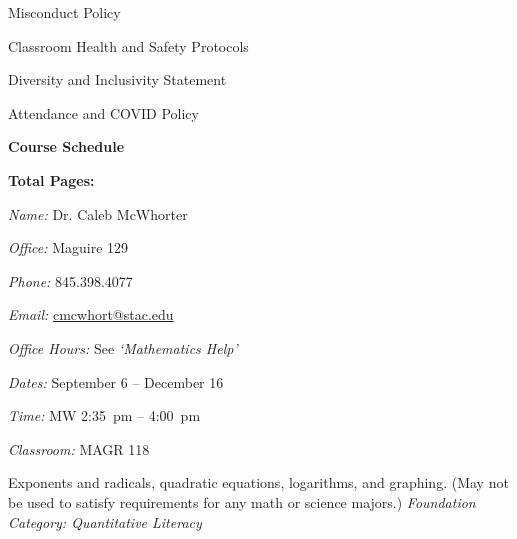 \documentclass[11pt,letterpaper]{article}
\makeatletter
\newcommand{\classdates}{September 6 -- December 16}
\newcommand{\classtimes}{MW 2:35~pm -- 4:00~pm}
\newcommand{\classroom}{MAGR 118}
\newcommand{\instructor}{Dr. Caleb McWhorter}
\newcommand{\office}{Maguire 129}
\newcommand{\phone}{845.398.4077}
\newcommand{\email}{cmcwhort@stac.edu}
\newcommand{\officehours}{See \textit{`Mathematics Help'}}
\makeatother
\begin{document}
\begin{minipage}[t]{0.45\textwidth}
\hspace{0.6cm} Misconduct Policy \dotfill \pageref{college_sexmisconduct} \par
\hspace{0.3cm} Classroom Health and Safety Protocols \dotfill \pageref{college_healthsafety} \par
\hspace{0.3cm} Diversity and Inclusivity Statement \dotfill \pageref{college_inclusive} \par
\hspace{0.3cm} Attendance and COVID Policy \dotfill \pageref{college_attnd} \par
{\bfseries\color{stacred} Course Schedule} \dotfill \pageref{schd} \par
\hfill {\bfseries\color{stacred} Total Pages:} \pageref*{LastPage}
\end{minipage}
\sectionbreak









\textit{Name:} \instructor \par
\textit{Office:} \office \par
\textit{Phone:} \phone \par
\textit{Email:} \href{mailto:\email}{\email} \par
\textit{Office Hours:} \officehours 
\sectionbreak



\textit{Dates:} \classdates \par
\textit{Time:} \classtimes \par
\textit{Classroom:} \classroom 
\sectionbreak



Exponents and radicals, quadratic equations, logarithms, and graphing. (May not be used to satisfy requirements for any math or science majors.) {\itshape Foundation Category: Quantitative Literacy}
\sectionbreak
\end{document}
